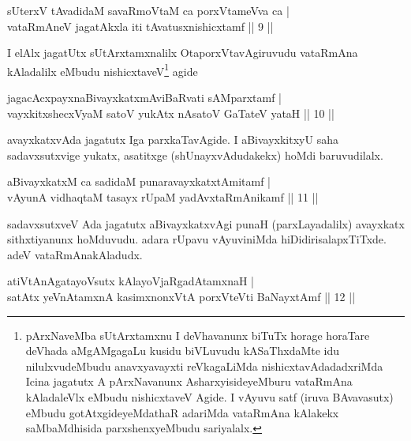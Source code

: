 \begin{shl}
sUterxV tAvadidaM savaRmoVtaM ca porxVtameVva ca |\\
vataRmAneV jagatAkxla iti tAvatusxnishicxtamf \hfill || 9 ||
\end{shl}

\begin{artha}
I elAlx jagatUtx sUtArxtamxnalilx OtaporxVtavAgiruvudu vataRmAna kAladalilx eMbudu nishicxtaveV\footnote[1]{pArxNaveMba sUtArxtamxnu I deVhavanunx biTuTx horage horaTare deVhada aMgAMgagaLu kusidu biVLuvudu kASaThxdaMte idu nilulxvudeMbudu anavxyavayxti reVkagaLiMda nishicxtavAdadadxriMda Icina jagatutx A pArxNavanunx AsharxyisideyeMburu vataRmAna kAladaleVlx eMbudu nishicxtaveV Agide. I vAyuvu satf (iruva BAvavasutx) eMbudu gotAtxgideyeMdathaR adariMda vataRmAna kAlakekx saMbaMdhisida parxshenxyeMbudu sariyalalx.} agide
\end{artha}

\begin{shl}
jagacAcxpayxnaBivayxkatxmAviBaRvati sAMparxtamf |\\
vayxkitxshecxVyaM satoV yukAtx nAsatoV GaTateV yataH \hfill || 10 ||
\end{shl}

\begin{artha}%
avayxkatxvAda jagatutx Iga parxkaTavAgide. I aBivayxkitxyU saha sadavxsutxvige yukatx, asatitxge (shUnayxvAdudakekx) hoMdi baruvudilalx.
\end{artha}

\begin{shl}
aBivayxkatxM ca sadidaM punaravayxkatxtAmitamf |\\
vAyunA vidhaqtaM tasayx rUpaM yadAvxtaRmAnikamf \hfill || 11 ||
\end{shl}

\begin{artha}
sadavxsutxveV Ada jagatutx aBivayxkatxvAgi punaH (parxLayadalilx) avayxkatx sithxtiyanunx hoMduvudu. adara rUpavu vAyuviniMda hiDidirisalapxTiTxde. adeV vataRmAnakAladudx. 
\end{artha}


\begin{shl}
atiVtAnAgatayoVsutx kAlayoVjaRgadAtamxnaH |\\
satAtx yeVnA\s \s tamxnA kasimxnonxVtA porxVteVti BaNayxtAmf \hfill || 12 ||
\end{shl}

